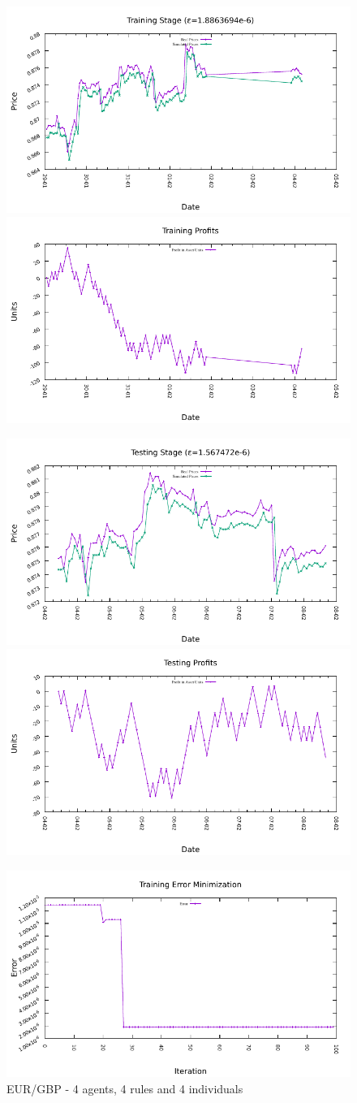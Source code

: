 \begin{figure}[htp]
  \centering

  \includegraphics[width=.45\textwidth]{img/plots/eur_gbp_h1-4agents-4rules-4ind-100gen_training_fit.pdf}\quad
  \includegraphics[width=.45\textwidth]{img/plots/eur_gbp_h1-4agents-4rules-4ind-100gen_training_profits.pdf}

  \medskip

  \includegraphics[width=.45\textwidth]{img/plots/eur_gbp_h1-4agents-4rules-4ind-100gen_testing_fit.pdf}\quad
  \includegraphics[width=.45\textwidth]{img/plots/eur_gbp_h1-4agents-4rules-4ind-100gen_testing_profits.pdf}

  \medskip

  \includegraphics[width=.45\textwidth]{img/plots/eur_gbp_h1-4agents-4rules-4ind-100gen_error_minimization.pdf}

  \caption{EUR/GBP - 4 agents, 4 rules and 4 individuals}
  \label{figure:eur-gbp-4agents-4rules-4individuals}
\end{figure}

